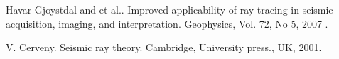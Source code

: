 
\begin{thebibliography}{10}

{\sc Havar Gjoystdal and et al.}. {Improved applicability of ray tracing in seismic acquisition, imaging, and interpretation}. Geophysics, Vol. 72, No 5, 2007 .



{\sc V. Cerveny}. {Seismic ray theory}. Cambridge, University press., UK, 2001.

\end{thebibliography}
